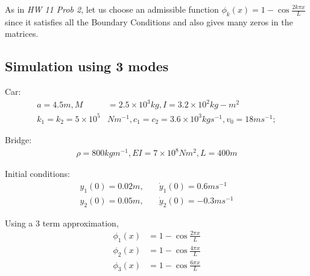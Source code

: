 \documentclass[11pt, oneside]{article}   	%
\begin{document}
As in \textit{HW 11 Prob 2}, let us choose an admissible function $\phi_k(x) = 1-\cos{\frac{2k \pi x}{L}}$ since it satisfies all the Boundary Conditions and also gives many zeros in the matrices.

\subsection{Simulation using 3 modes}
Car:
\begin{align}
a = 4.5m, M &= 2.5\times 10^3kg, I = 3.2 \times 10^2kg-m^2 \\
k_1 = k_2 = 5\times 10^5&Nm^{-1}, c_1=c_2 = 3.6 \times 10^3kgs^{-1}, v_0 = 18ms^{-1};
\end{align}

\noindent Bridge:
\begin{align}
\rho = 800kgm^{-1}, EI = 7 \times 10^8 Nm^2, L=400m
\end{align}

\noindent Initial conditions:
\begin{align}
y_1(0) = 0.02 m,\quad & \dot{y}_1(0)=0.6ms^{-1} \\
y_2(0) = 0.05 m,\quad & \dot{y}_2(0)=-0.3ms^{-1}
\end{align}

\noindent Using a 3 term approximation,
\begin{align}
\phi_1(x) &= 1-\cos{\frac{2 \pi x}{L}} \\
\phi_2(x) &= 1-\cos{\frac{4 \pi x}{L}} \\
\phi_3(x) &= 1-\cos{\frac{6 \pi x}{L}}
\end{align}
\end{document}
